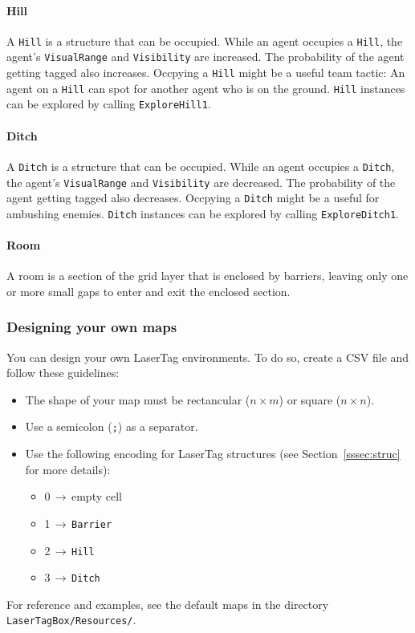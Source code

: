 \documentclass[a4paper,english,DIV=16,11pt,parskip=half,dvipsnames,listof=totoc,index=totoc,bibliography=totoc]{scrartcl}
\begin{document}
\paragraph{Hill} \label{par:hillDesc}
A \texttt{Hill} is a structure that can be occupied. While an agent occupies a \texttt{Hill}, the agent's \texttt{VisualRange} and \texttt{Visibility} are increased. The probability of the agent getting tagged also increases. Occpying a \texttt{Hill} might be a useful team tactic: An agent on a \texttt{Hill} can spot for another agent who is on the ground. \texttt{Hill} instances can be explored by calling \texttt{ExploreHill1}.
%
\paragraph{Ditch} \label{par:ditchDesc}
A \texttt{Ditch} is a structure that can be occupied. While an agent occupies a \texttt{Ditch}, the agent's \texttt{VisualRange} and \texttt{Visibility} are decreased. The probability of the agent getting tagged also decreases. Occpying a \texttt{Ditch} might be a useful for ambushing enemies. \texttt{Ditch} instances can be explored by calling \texttt{ExploreDitch1}.
%
\paragraph{Room} \label{par:roomDesc}
A room is a section of the grid layer that is enclosed by barriers, leaving only one or more small gaps to enter and exit the enclosed section.
%
\subsubsection{Designing your own maps}
%
You can design your own LaserTag environments. To do so, create a CSV file and follow these guidelines:
%
\begin{itemize}
  \item The shape of your map must be rectancular ($n \times m$) or square ($n \times n$).
  \item Use a semicolon (\texttt{;}) as a separator.
  \item Use the following encoding for LaserTag structures (see Section~\ref{sssec:struc} for more details):
  \begin{itemize}
    \item 0$\,\to\,$empty cell
    \item 1$\,\to\,$\texttt{Barrier}
    \item 2$\,\to\,$\texttt{Hill}
    \item 3$\,\to\,$\texttt{Ditch}
  \end{itemize}
\end{itemize}
%
For reference and examples, see the default maps in the directory \texttt{LaserTagBox/Resources/}.
%
\end{document}
